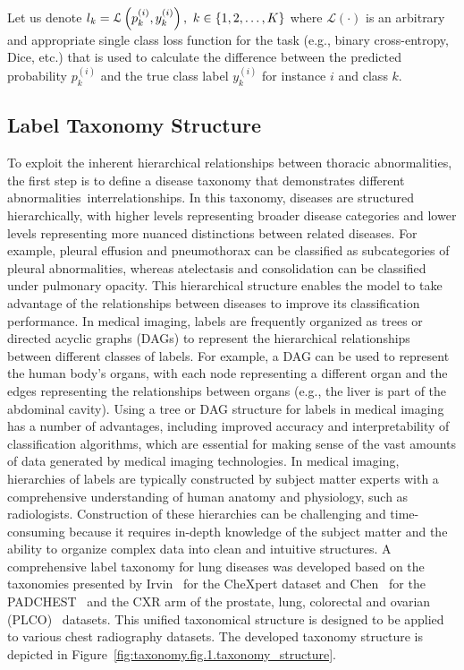 Let us denote $l_k = \mathcal{L} \left(p_k^{(i)},y_k^{(i)}\right),\hspace{0.33em}k \in \{1,2,\dots,K\} $ where $\mathcal{L}(\cdot) $ is an arbitrary and appropriate single class loss function for the task (e.g., binary cross-entropy, Dice, etc.) that is used to calculate the difference between the predicted probability $p_k^{(i)} $ and the true class label $y_k^{(i)} $ for instance $i$ and class $k $.
\subsection{Label Taxonomy Structure}\label{subsec:label-taxonomy-and-hierarchy}
To exploit the inherent hierarchical relationships between thoracic abnormalities, the first step is to define a disease taxonomy that demonstrates different abnormalities~interrelationships. In this taxonomy, diseases are structured hierarchically, with higher levels representing broader disease categories and lower levels representing more nuanced distinctions between related diseases. For example, pleural effusion and pneumothorax can be classified as subcategories of pleural abnormalities, whereas atelectasis and consolidation can be classified under pulmonary opacity. This hierarchical structure enables the model to take advantage of the relationships between diseases to improve its classification performance.
In medical imaging, labels are frequently organized as trees or directed acyclic graphs (DAGs) to represent the hierarchical relationships between different classes of labels. For example, a DAG can be used to represent the human body's organs, with each node representing a different organ and the edges representing the relationships between organs (e.g., the liver is part of the abdominal cavity). Using a tree or DAG structure for labels in medical imaging has a number of advantages, including improved accuracy and interpretability of classification algorithms, which are essential for making sense of the vast amounts of data generated by medical imaging technologies. In medical imaging, hierarchies of labels are typically constructed by subject matter experts with a comprehensive understanding of human anatomy and physiology, such as radiologists. Construction of these hierarchies can be challenging and time-consuming because it requires in-depth knowledge of the subject matter and the ability to organize complex data into clean and intuitive structures.
A comprehensive label taxonomy for lung diseases was developed based on the taxonomies presented by Irvin~\cite{irvin_CheXpert_2019} for the CheXpert dataset and Chen~\cite{chen_Deep_2020} for the PADCHEST~\cite{bustos_Padchest_2020} and the CXR arm of the prostate, lung, colorectal and ovarian (PLCO)~\cite{gohagan_Prostate_2000} datasets. This unified taxonomical structure is designed to be applied to various chest radiography datasets. The developed taxonomy structure is depicted in Figure~\ref{fig:taxonomy.fig.1.taxonomy_structure}.
